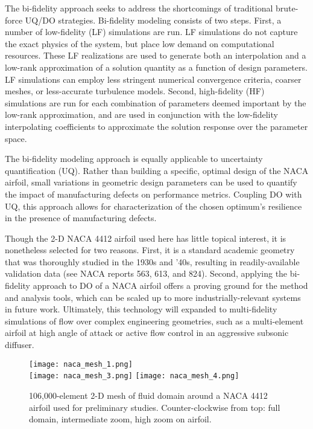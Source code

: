 \documentclass[11pt]{article}
\begin{document}
The bi-fidelity approach seeks to address the shortcomings of traditional brute-force UQ/DO strategies. Bi-fidelity modeling consists of two steps. First, a number of low-fidelity (LF) simulations are run. LF simulations do not capture the exact physics of the system, but place low demand on computational resources. These LF realizations are used to generate both an interpolation and a low-rank approximation of a solution quantity as a function of design parameters. LF simulations can employ less stringent numerical convergence criteria, coarser meshes, or less-accurate turbulence models. Second, high-fidelity (HF) simulations are run for each combination of parameters deemed important by the low-rank approximation, and are used in conjunction with the low-fidelity interpolating coefficients to approximate the solution response over the parameter space.

The bi-fidelity modeling approach is equally applicable to uncertainty quantification (UQ). Rather than building a specific, optimal design of the NACA airfoil, small variations in geometric design parameters can be used to quantify the impact of manufacturing defects on performance metrics. Coupling DO with UQ, this approach allows for characterization of the chosen optimum's resilience in the presence of manufacturing defects.

Though the 2-D NACA 4412 airfoil used here has little topical interest, it is nonetheless selected for two reasons. First, it is a standard academic geometry that was thoroughly studied in the 1930s and '40s, resulting in readily-available validation data (see NACA reports 563, 613, and 824). Second, applying the bi-fidelity approach to DO of a NACA airfoil offers a proving ground for the method and analysis tools, which can be scaled up to more industrially-relevant systems in future work. Ultimately, this technology will expanded to multi-fidelity simulations of flow over complex engineering geometries, such as a multi-element airfoil at high angle of attack or active flow control in an aggressive subsonic diffuser.

\begin{figure}[ht]
\begin{center}
\texttt{[image: naca\_mesh\_1.png]}
\\[1.5ex]
\texttt{[image: naca\_mesh\_3.png]}
\hspace*{1ex}
\texttt{[image: naca\_mesh\_4.png]}
\vspace{1ex}
\caption{106,000-element 2-D mesh of fluid domain around a NACA 4412 airfoil used for preliminary studies. Counter-clockwise from top: full domain, intermediate zoom, high zoom on airfoil.}
\label{fig:mesh}
\end{center}
\end{figure}
\end{document}
